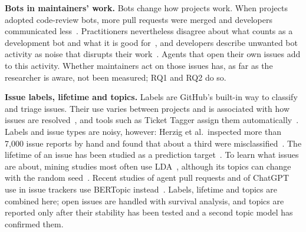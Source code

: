 \textbf{Bots in maintainers' work.} Bots change how projects work. When projects adopted code-review bots, more pull requests were merged and developers communicated less~\cite{wessel2020effects}. Practitioners nevertheless disagree about what counts as a development bot and what it is good for~\cite{erlenhov2020bots}, and developers describe unwanted bot activity as noise that disrupts their work~\cite{wessel2021disturb}. Agents that open their own issues add to this activity. Whether maintainers act on those issues has, as far as the researcher is aware, not been measured; RQ1 and RQ2 do so.

\textbf{Issue labels, lifetime and topics.} Labels are GitHub's built-in way to classify and triage issues. Their use varies between projects and is associated with how issues are resolved~\cite{cabot2015labels}, and tools such as Ticket Tagger assign them automatically~\cite{kallis2019tagger}. Labels and issue types are noisy, however: Herzig et al.\ inspected more than 7{,}000 issue reports by hand and found that about a third were misclassified~\cite{herzig2013bug}. The lifetime of an issue has been studied as a prediction target~\cite{kikas2016lifetime}. To learn what issues are about, mining studies most often use LDA~\cite{blei2003lda,chen2016survey,silva2021topic}, although its topics can change with the random seed~\cite{agrawal2018wrong,greene2014stability}. Recent studies of agent pull requests and of ChatGPT use in issue trackers use BERTopic instead~\cite{opu2025performance,das2024chatgpt,grootendorst2022bertopic}. Labels, lifetime and topics are combined here; open issues are handled with survival analysis, and topics are reported only after their stability has been tested and a second topic model has confirmed them.
